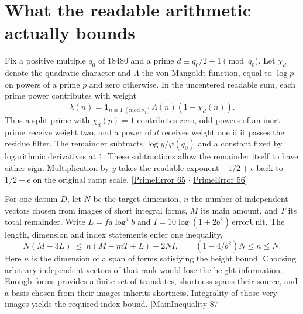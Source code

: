 \documentclass[12pt,letterpaper]{article}
\begin{document}
\section{What the readable arithmetic actually bounds}
Fix a positive multiple $q_0$ of $18480$ and a prime $d\equiv q_0/2-1\pmod {q_0}$. Let $\chi_d$ denote the quadratic character and $\Lambda$ the von Mangoldt function, equal to $\log p$ on powers of a prime $p$ and zero otherwise. In the uncentered readable sum, each prime power contributes with weight
\[
 \lambda(n)=\mathbf1_{n\equiv1\ (\mathrm{mod}\ q_0)}\Lambda(n)(1-\chi_d(n)).
\]
Thus a split prime with $\chi_d(p)=1$ contributes zero, odd powers of an inert prime receive weight two, and a power of $d$ receives weight one if it passes the residue filter. The remainder subtracts $\log y/\varphi(q_0)$ and a constant fixed by logarithmic derivatives at $1$. These subtractions allow the remainder itself to have either sign. Multiplication by $y$ takes the readable exponent $-1/2+\epsilon$ back to $1/2+\epsilon$ on the original ramp scale. {\small\sffamily\color{mute}[\href{https://github.com/leanprover-community/riemann-hypothesis/blob/e063a923620ee7787b4a1270421478645bf66bdb/src/New/Reduction/Zeros/PrimeError.lean#L65}{PrimeError 65} $\cdot$ \href{https://github.com/leanprover-community/riemann-hypothesis/blob/e063a923620ee7787b4a1270421478645bf66bdb/src/New/Reduction/Zeros/PrimeError.lean#L56}{PrimeError 56}]}

For one datum $D$, let $N$ be the target dimension, $n$ the number of independent vectors chosen from images of short integral forms, $M$ its main amount, and $T$ its total remainder. Write $L=f a\log^4 b$ and $I=10\log(1+2b^2)\,\mathrm{errorUnit}$. The length, dimension and index statements enter one inequality,
\[
 N(M-3L)\ \le\ n(M-mT+L)+2NI,\qquad
 (1-4/b^2)N\le n\le N .
\]
Here $n$ is the dimension of a span of forms satisfying the height bound. Choosing arbitrary independent vectors of that rank would lose the height information. Enough forms provides a finite set of translates, shortness spans their source, and a basis chosen from their images inherits shortness. Integrality of those very images yields the required index bound. {\small\sffamily\color{mute}[\href{https://github.com/leanprover-community/riemann-hypothesis/blob/e063a923620ee7787b4a1270421478645bf66bdb/src/New/Reduction/MainInequality.lean#L87}{MainInequality 87}]}
\end{document}
